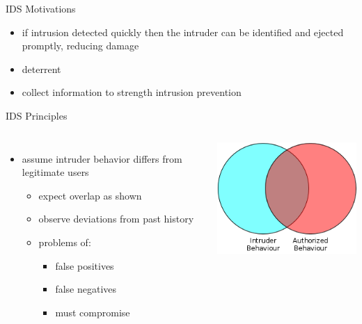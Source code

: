 \documentclass{beamer}
\begin{document}
\begin{frame}{IDS Motivations}
  \begin{itemize}
    \item if intrusion detected quickly then the intruder can be
      identified and ejected promptly, reducing damage
    \item deterrent
    \item collect information to strength intrusion prevention
  \end{itemize}
\end{frame}

\begin{frame}{IDS Principles}
  \begin{columns}[c]
  \begin{itemize}
  \item assume intruder behavior differs from legitimate 
    users 
    \begin{itemize}
    \item expect overlap as shown 
    \item observe deviations 
      from past history 
    \item problems of: 
      \begin{itemize}
      \item false positives 
      \item false negatives 
      \item must compromise 
      \end{itemize}
    \end{itemize}
  \end{itemize}
  \includegraphics[width=1\linewidth]{behaviour}
  \end{columns}
\end{frame}
\end{document}
